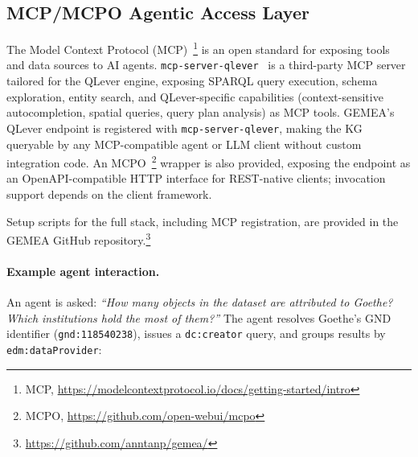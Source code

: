 \subsection{MCP/MCPO Agentic Access Layer}
\label{sec:resource:mcp}

The Model Context Protocol (MCP)~\footnote{MCP, \url{https://modelcontextprotocol.io/docs/getting-started/intro}} is an open standard for exposing tools and data sources to AI agents.
\texttt{mcp-server-qlever}~\cite{mcpqlever} is a third-party MCP server tailored for the QLever engine, exposing SPARQL query execution, schema exploration, entity search, and QLever-specific capabilities (context-sensitive autocompletion, spatial queries, query plan analysis) as MCP tools.
GEMEA's QLever endpoint is registered with \texttt{mcp-server-qlever}, making the KG queryable by any MCP-compatible agent or LLM client without custom integration code.
An MCPO~\footnote{MCPO, \url{https://github.com/open-webui/mcpo}} wrapper is also provided, exposing the endpoint as an OpenAPI-compatible HTTP interface for REST-native clients; invocation support depends on the client framework.

Setup scripts for the full stack, including MCP registration, are provided in the GEMEA GitHub repository.\footnote{\url{https://github.com/anntanp/gemea/}}

\paragraph{Example agent interaction.}
An agent is asked: \textit{``How many objects in the dataset are attributed to Goethe? Which institutions hold the most of them?''}
The agent resolves Goethe's GND identifier (\texttt{gnd:118540238}), issues a \texttt{dc:creator} query, and groups results by \texttt{edm:dataProvider}:

